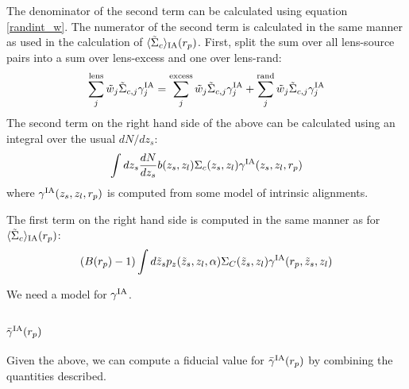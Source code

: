\documentclass[onecolumn,amsmath,aps,fleqn, superscriptaddress]{revtex4}
\begin{document}
The denominator of the second term can be calculated using equation \ref{randint_w}. The numerator of the second term is calculated in the same manner as used in the calculation of $\langle \tilde{\Sigma}_c\rangle_{\rm IA} (r_p)$. First, split the sum over all lens-source pairs into a sum over lens-excess and one over lens-rand:
\begin{equation}
\sum\limits_{j}^{\rm lens} \tilde{w}_j \tilde{\Sigma}_{c,j} \gamma^{\rm IA}_j  = \sum\limits_{j}^{\rm excess} \tilde{w}_j \tilde{\Sigma}_{c,j} \gamma^{\rm IA}_j  + \sum\limits_{j}^{\rm rand} \tilde{w}_j \tilde{\Sigma}_{c,j} \gamma^{\rm IA}_j 
\label{splitIA}
\end{equation}
The second term on the right hand side of the above can be calculated using an integral over the usual $dN / dz_s$:
\begin{equation}
\int dz_s \frac{dN}{dz_s} b(z_s, z_l) \Sigma_c(z_s, z_l) \gamma^{\rm IA}(z_s, z_l, r_p)
\label{rand_IA}
\end{equation}
where $\gamma^{\rm IA}(z_s, z_l, r_p)$ is computed from some model of intrinsic alignments. 

The first term on the right hand side is computed in the same manner as for $\langle \tilde{\Sigma}_c\rangle_{\rm IA} (r_p)$:
\begin{equation}
(B(r_p)-1) \int d\tilde{z}_s p_z(\tilde{z}_s, z_l, \alpha) \Sigma_C(\tilde{z}_s, z_l) \gamma^{\rm IA}(r_p, \tilde{z}_s, z_l)
\label{excess_IA}
\end{equation}

We need a model for $\gamma^{\rm IA}$. 

\subsection*{$\bar{\gamma}^{\rm IA}(r_p)$}
Given the above, we can compute a fiducial value for $\bar{\gamma}^{\rm IA}(r_p)$ by combining the quantities described. 











\end{document}
